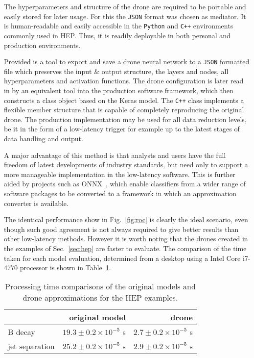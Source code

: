 The hyperparameters and structure of the drone are required to be
portable and easily stored for later usage. For this the {\tt JSON} format was chosen as
mediator. It is human-readable and easily accessible in the {\tt Python} and {\tt C++}
environments commonly used in HEP. Thus, it is readily deployable in both personal and production environments.

Provided is a tool to export and save a drone neural network to a {\tt JSON}
formatted file which preserves the input \& output structure,
the layers and nodes, all hyperparameters and activation functions.
The drone configuration is later read in by an equivalent tool into the production software framework,
which then constructs a class object based on the Keras model. The {\tt C++} class implements
a flexible member structure that is capable of completely reproducing the original drone. The production
implementation may be used for all data reduction levels, be it in the form of a low-latency trigger
for example up to the latest stages of data handling and output.

A major advantage of this method is that analysts and users have the full freedom of latest developments
of industry standards, but need only to support a more manageable implementation in the low-latency
software. This is further aided by projects such as ONNX~\cite{ONNX}, which enable classifiers from a wider
range of software packages to be converted to a framework in which an approximation converter
is available.

The identical performance show in Fig.~\ref{fig:roc} is clearly the ideal scenario, even though
such good agreement is not always required to give better results than other low-latency methods.
However it is worth noting that the drones created in the examples of Sec.~\ref{sec:hep} are faster to
evaluate. The comparison of the time taken for each model evaluation, determined from a desktop
using a Intel Core i7-4770 processor is shown in Table~\ref{tab:comp}.
\begin{table}[t]
  \centering
  \caption{Processing time comparisons of the original models and drone
  approximations for the HEP examples. \label{tab:comp}}
  \begin{tabular}{l|rr}
                   & original model                  & drone \\
    \hline
    B decay        & $19.3 \pm 0.2 \times 10^{-5}$ s & $2.7 \pm 0.2 \times 10^{-5}$ s \\
    jet separation & $25.2 \pm 0.2 \times 10^{-5}$ s & $2.9 \pm 0.2 \times 10^{-5}$ s \\
  \end{tabular}
\end{table}

